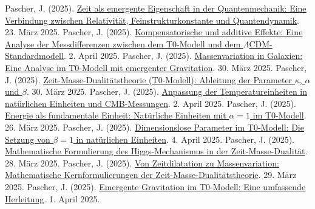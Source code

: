 \documentclass[12pt,a4paper]{article}
\begin{document}
\begin{thebibliography}{99}
		 Pascher, J. (2025). \href{https://github.com/jpascher/T0-Time-Mass-Duality/tree/main/2/pdf/Deutsch/NatEinheitenAlpha1.pdf}{Zeit als emergente Eigenschaft in der Quantenmechanik: Eine Verbindung zwischen Relativität, Feinstrukturkonstante und Quantendynamik}. 23. März 2025.
		 Pascher, J. (2025). \href{https://github.com/jpascher/T0-Time-Mass-Duality/tree/main/2/pdf/Deutsch/MessdifferenzenT0Standard.pdf}{Kompensatorische und additive Effekte: Eine Analyse der Messdifferenzen zwischen dem T0-Modell und dem \(\Lambda\)CDM-Standardmodell}. 2. April 2025.
		 Pascher, J. (2025). \href{https://github.com/jpascher/T0-Time-Mass-Duality/tree/main/2/pdf/Deutsch/MassVarGalaxien.pdf}{Massenvariation in Galaxien: Eine Analyse im T0-Modell mit emergenter Gravitation}. 30. März 2025.
		 Pascher, J. (2025). \href{https://github.com/jpascher/T0-Time-Mass-Duality/tree/main/2/pdf/Deutsch/ZeitMasseT0Params.pdf}{Zeit-Masse-Dualitätstheorie (T0-Modell): Ableitung der Parameter \(\kappa\), \(\alpha\) und \(\beta\)}. 30. März 2025.
		 Pascher, J. (2025). \href{https://github.com/jpascher/T0-Time-Mass-Duality/tree/main/2/pdf/Deutsch/NatEinheitenAlpha1.pdf}{Anpassung der Temperatureinheiten in natürlichen Einheiten und CMB-Messungen}. 2. April 2025.
		 Pascher, J. (2025). \href{https://github.com/jpascher/T0-Time-Mass-Duality/tree/main/2/pdf/Deutsch/NatEinheitenAlpha1.pdf}{Energie als fundamentale Einheit: Natürliche Einheiten mit \(\alpha = 1\) im T0-Modell}. 26. März 2025.
		 Pascher, J. (2025). \href{https://github.com/jpascher/T0-Time-Mass-Duality/tree/main/2/pdf/Deutsch/Alpha1Beta1Konsistenz.pdf}{Dimensionslose Parameter im T0-Modell: Die Setzung von \(\beta = 1\) in natürlichen Einheiten}. 4. April 2025.
		 Pascher, J. (2025). \href{https://github.com/jpascher/T0-Time-Mass-Duality/tree/main/2/pdf/Deutsch/MathHiggsZeitMasse.pdf}{Mathematische Formulierung des Higgs-Mechanismus in der Zeit-Masse-Dualität}. 28. März 2025.
		 Pascher, J. (2025). \href{https://github.com/jpascher/T0-Time-Mass-Duality/tree/main/2/pdf/Deutsch/MathZeitMasseLagrange.pdf}{Von Zeitdilatation zu Massenvariation: Mathematische Kernformulierungen der Zeit-Masse-Dualitätstheorie}. 29. März 2025.
		 Pascher, J. (2025). \href{https://github.com/jpascher/T0-Time-Mass-Duality/tree/main/2/pdf/Deutsch/EmergentGravT0.pdf}{Emergente Gravitation im T0-Modell: Eine umfassende Herleitung}. 1. April 2025.

\end{thebibliography}
\end{document}
